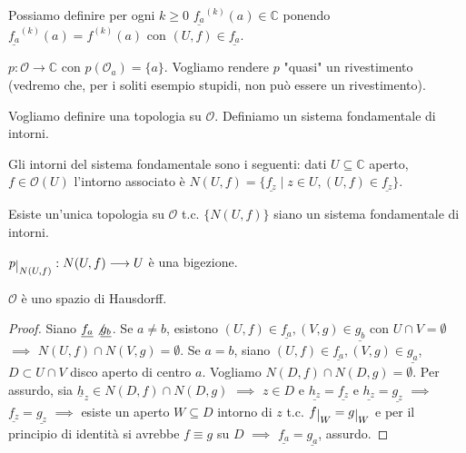 \begin{oss}
  Possiamo definire per ogni $k \ge 0$ $\underline{f_a}^{(k)}(a) \in \mathbb{C}$ ponendo $\underline{f_a}^{(k)}(a)=f^{(k)}(a)$ con $(U, f) \in \underline{f_a}$.
\end{oss}

\begin{defn}
  $p: \mathcal{O} \longrightarrow \mathbb{C}$ con $p(\mathcal{O}_a)=\{a\}$. Vogliamo rendere $p$ "quasi" un rivestimento (vedremo che, per i soliti esempio stupidi, non può essere un rivestimento).
\end{defn}

Vogliamo definire una topologia su $\mathcal{O}$. Definiamo un sistema fondamentale di intorni.

\begin{defn}
  Gli intorni del sistema fondamentale sono i seguenti: dati $U \subseteq \mathbb{C}$ aperto, $f \in \mathcal{O}(U)$ l'intorno associato è $N(U, f)=\{\underline{f_z} \mid z \in U, (U, f) \in \underline{f_z}\}$.
\end{defn}

\begin{exc}
  Esiste un'unica topologia su $\mathcal{O}$ t.c. $\{N(U, f)\}$ siano un sistema fondamentale di intorni.
\end{exc}

\begin{oss}
  $p\restrict{N(U, f)}:N(U, f) \longrightarrow U$ è una bigezione.
\end{oss}

\begin{prop}
  $\mathcal{O}$ è uno spazio di Hausdorff.
\end{prop}

\begin{proof}
  Siano $\underline{f_a} \not \underline{g_b}$. Se $a \not= b$, esistono $(U, f) \in \underline{f_a}, (V, g) \in \underline{g_b}$ con $U \cap V=\emptyset$ $\implies$ $N(U, f) \cap N(V, g)=\emptyset$.
  Se $a=b$, siano $(U, f) \in \underline{f_a}, (V, g) \in \underline{g_a}$, $D \subset U \cap V$ disco aperto di centro $a$. Vogliamo $N(D, f) \cap N(D, g)=\emptyset$.
  Per assurdo, sia $\underline{h}_z \in N(D, f) \cap N(D, g)$ $\implies$ $z \in D$ e $\underline{h_z}=\underline{f_z}$ e $\underline{h_z}=\underline{g_z}$ $\implies$ $\underline{f_z}=\underline{g_z}$ $\implies$ esiste un aperto $W \subseteq D$ intorno di $z$ t.c. $f\restrict{W}=g\restrict{W}$ e per il principio di identità si avrebbe $f \equiv g$ su $D$ $\implies$ $\underline{f_a}=\underline{g_a}$, assurdo.
\end{proof}

